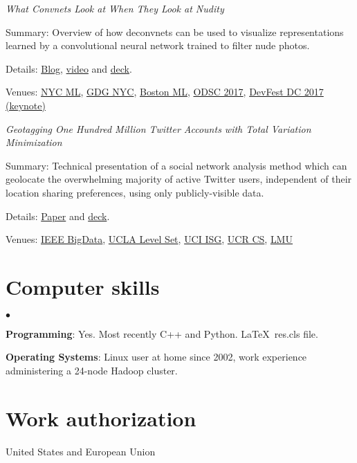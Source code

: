 \documentclass[margin,line]{res}
\newenvironment{list1}{
  \begin{list}{\ding{113}}{%
      \setlength{\itemsep}{0.0in}
      \setlength{\parsep}{0in} \setlength{\parskip}{0in}
      \setlength{\topsep}{0in} \setlength{\partopsep}{0in}
      \setlength{\leftmargin}{0.17in}}}{\end{list}}
\newenvironment{list2}{
  \begin{list}{$\bullet$}{%
      \setlength{\itemsep}{0in}
      \setlength{\parsep}{0in} \setlength{\parskip}{0in}
      \setlength{\topsep}{0in} \setlength{\partopsep}{0in}
      \setlength{\leftmargin}{0.2in}}}{\end{list}}
\begin{document}
\begin{resume}
{\it What Convnets Look at When They Look at Nudity}
\begin{list1}
\item [] Summary: Overview of how deconvnets can be used to visualize representations learned by a convolutional neural network trained to filter nude photos.
\item [] Details: \href{http://blog.clarifai.com/what-convolutional-neural-networks-see-at-when-they-see-nudity/}{Blog}, \href{https://www.youtube.com/watch?v=dWgXPKMvxDg}{video} and \href{https://docs.google.com/presentation/d/14SNvMFqyqd3qlKvibc06GkB1lLmDutzcr04uJ_LnX4s/edit#slide=id.g1525123836_1_870}{deck}.
\item [] Venues: \href{https://www.meetup.com/NYC-Machine-Learning/events/235535192/}{NYC ML}, \href{https://www.meetup.com/gdgnyc/events/231372185/}{GDG NYC}, \href{https://www.meetup.com/bostonml/events/235419742/}{Boston ML}, \href{https://www.odsc.com/training/portfolio/convolutional-neural-networks-look-look-nudity}{ODSC 2017}, \href{http://www.devfestdc.org/speakers/ryan-compton/}{DevFest DC 2017 (keynote)}
\end{list1}

{\it Geotagging One Hundred Million Twitter Accounts with Total Variation Minimization}
\begin{list1}
\item [] Summary: Technical presentation of a social network analysis method which can geolocate the overwhelming majority of active Twitter users, independent of their location sharing preferences, using only publicly-visible data.
\item [] Details: \href{https://arxiv.org/abs/1404.7152}{Paper} and \href{http://ryancompton.net/assets/resume/geolocation_slides_2.pdf}{deck}.
\item [] Venues: \href{http://cci.drexel.edu/bigdata/bigdata2014/}{IEEE BigData}, \href{http://papyrus.math.ucla.edu/seminars/display.php?&id=831425}{UCLA Level Set}, \href{http://calendar.ics.uci.edu/event.php?calendar=1&category=&event=1386&date=2015-01-16}{UCI ISG}, \href{http://wwwcontent.cs.ucr.edu/department/eventlookup/491}{UCR CS}, \href{http://myweb.lmu.edu/yma/LMUMathSeminar.htm}{LMU}
\end{list1}


\section{\sc Computer skills}
\begin{list2}
\item[]{\bf Programming}: Yes. Most recently C++ and Python. \LaTeX\ res.cls file.
\item[]{\bf Operating Systems}: Linux user at home since 2002, work experience administering a 24-node Hadoop cluster.
\end{list2}

\section{\sc Work authorization}
United States and European Union

\end{resume}
\end{document}
